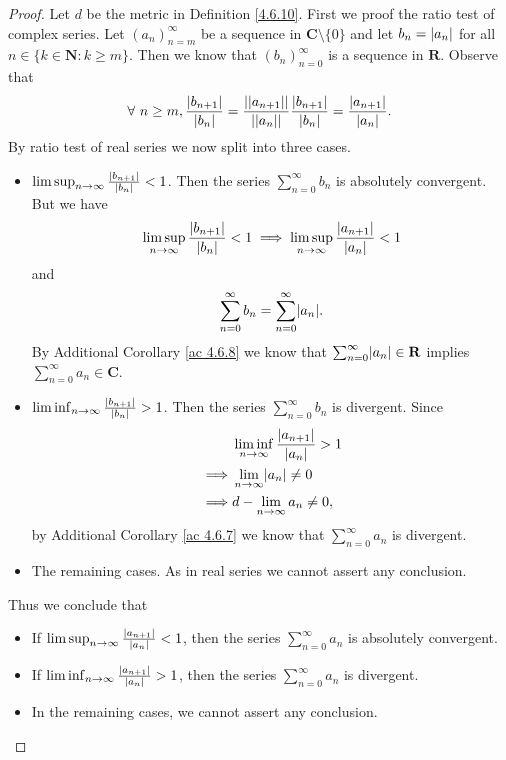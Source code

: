 \begin{proof}
    Let \(d\) be the metric in Definition \ref{4.6.10}.
    First we proof the ratio test of complex series.
    Let \((a_n)_{n = m}^\infty\) be a sequence in \(\mathbf{C} \setminus \{0\}\) and let \(b_n = \abs*{a_n}\) for all \(n \in \{k \in \mathbf{N} : k \geq m\}\).
    Then we know that \((b_n)_{n = 0}^\infty\) is a sequence in \(\mathbf{R}\).
    Observe that
    \[
        \forall\ n \geq m, \frac{\abs*{b_{n + 1}}}{\abs*{b_n}} = \frac{\abs*{\abs*{a_{n + 1}}}}{\abs*{\abs*{a_n}}} \frac{\abs*{b_{n + 1}}}{\abs*{b_n}} = \frac{\abs*{a_{n + 1}}}{\abs*{a_n}}.
    \]
    By ratio test of real series we now split into three cases.
    \begin{itemize}
        \item \(\limsup_{n \to \infty} \frac{\abs*{b_{n + 1}}}{\abs*{b_n}} < 1\).
              Then the series \(\sum_{n = 0}^\infty b_n\) is absolutely convergent.
              But we have
              \[
                  \limsup_{n \to \infty} \frac{\abs*{b_{n + 1}}}{\abs*{b_n}} < 1 \implies \limsup_{n \to \infty} \frac{\abs*{a_{n + 1}}}{\abs*{a_n}} < 1
              \]
              and
              \[
                  \sum_{n = 0}^\infty b_n = \sum_{n = 0}^\infty \abs*{a_n}.
              \]
              By Additional Corollary \ref{ac 4.6.8} we know that \(\sum_{n = 0}^\infty \abs*{a_n} \in \mathbf{R}\) implies \(\sum_{n = 0}^\infty a_n \in \mathbf{C}\).
        \item \(\liminf_{n \to \infty} \frac{\abs*{b_{n + 1}}}{\abs*{b_n}} > 1\).
              Then the series \(\sum_{n = 0}^\infty b_n\) is divergent.
              Since
              \begin{align*}
                           & \liminf_{n \to \infty} \frac{\abs*{a_{n + 1}}}{\abs*{a_n}} > 1 \\
                  \implies & \lim_{n \to \infty} \abs*{a_n} \neq 0                          \\
                  \implies & d - \lim_{n \to \infty} a_n \neq 0,
              \end{align*}
              by Additional Corollary \ref{ac 4.6.7} we know that \(\sum_{n = 0}^\infty a_n\) is divergent.
        \item The remaining cases.
              As in real series we cannot assert any conclusion.
    \end{itemize}
    Thus we conclude that
    \begin{itemize}
        \item If \(\limsup_{n \to \infty} \frac{\abs*{a_{n + 1}}}{\abs*{a_n}} < 1\), then the series \(\sum_{n = 0}^\infty a_n\) is absolutely convergent.
        \item If \(\liminf_{n \to \infty} \frac{\abs*{a_{n + 1}}}{\abs*{a_n}} > 1\), then the series \(\sum_{n = 0}^\infty a_n\) is divergent.
        \item In the remaining cases, we cannot assert any conclusion.
    \end{itemize}


\end{proof}
